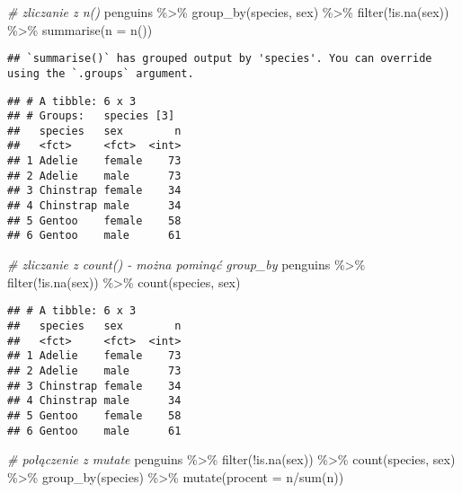 \documentclass[
]{book}
\newenvironment{Shaded}{\begin{snugshade}}{\end{snugshade}}
\newcommand{\AttributeTok}[1]{\textcolor[rgb]{0.77,0.63,0.00}{#1}}
\newcommand{\CommentTok}[1]{\textcolor[rgb]{0.56,0.35,0.01}{\textit{#1}}}
\newcommand{\FunctionTok}[1]{\textcolor[rgb]{0.00,0.00,0.00}{#1}}
\newcommand{\NormalTok}[1]{#1}
\newcommand{\SpecialCharTok}[1]{\textcolor[rgb]{0.00,0.00,0.00}{#1}}
\begin{document}
\begin{Shaded}
\begin{Highlighting}[]
\CommentTok{\# zliczanie z n()}
\NormalTok{penguins }\SpecialCharTok{\%\textgreater{}\%} \FunctionTok{group\_by}\NormalTok{(species, sex) }\SpecialCharTok{\%\textgreater{}\%} \FunctionTok{filter}\NormalTok{(}\SpecialCharTok{!}\FunctionTok{is.na}\NormalTok{(sex)) }\SpecialCharTok{\%\textgreater{}\%}
  \FunctionTok{summarise}\NormalTok{(}\AttributeTok{n =} \FunctionTok{n}\NormalTok{())}
\end{Highlighting}
\end{Shaded}

\begin{verbatim}
## `summarise()` has grouped output by 'species'. You can override using the `.groups` argument.
\end{verbatim}

\begin{verbatim}
## # A tibble: 6 x 3
## # Groups:   species [3]
##   species   sex        n
##   <fct>     <fct>  <int>
## 1 Adelie    female    73
## 2 Adelie    male      73
## 3 Chinstrap female    34
## 4 Chinstrap male      34
## 5 Gentoo    female    58
## 6 Gentoo    male      61
\end{verbatim}

\begin{Shaded}
\begin{Highlighting}[]
\CommentTok{\# zliczanie z count() {-} można pominąć group\_by}
\NormalTok{penguins }\SpecialCharTok{\%\textgreater{}\%} \FunctionTok{filter}\NormalTok{(}\SpecialCharTok{!}\FunctionTok{is.na}\NormalTok{(sex)) }\SpecialCharTok{\%\textgreater{}\%}
  \FunctionTok{count}\NormalTok{(species, sex)}
\end{Highlighting}
\end{Shaded}

\begin{verbatim}
## # A tibble: 6 x 3
##   species   sex        n
##   <fct>     <fct>  <int>
## 1 Adelie    female    73
## 2 Adelie    male      73
## 3 Chinstrap female    34
## 4 Chinstrap male      34
## 5 Gentoo    female    58
## 6 Gentoo    male      61
\end{verbatim}

\begin{Shaded}
\begin{Highlighting}[]
\CommentTok{\# połączenie z mutate}
\NormalTok{penguins }\SpecialCharTok{\%\textgreater{}\%} \FunctionTok{filter}\NormalTok{(}\SpecialCharTok{!}\FunctionTok{is.na}\NormalTok{(sex)) }\SpecialCharTok{\%\textgreater{}\%} 
  \FunctionTok{count}\NormalTok{(species, sex) }\SpecialCharTok{\%\textgreater{}\%}
  \FunctionTok{group\_by}\NormalTok{(species) }\SpecialCharTok{\%\textgreater{}\%}
  \FunctionTok{mutate}\NormalTok{(}\AttributeTok{procent =}\NormalTok{ n}\SpecialCharTok{/}\FunctionTok{sum}\NormalTok{(n))}
\end{Highlighting}
\end{Shaded}
\end{document}
